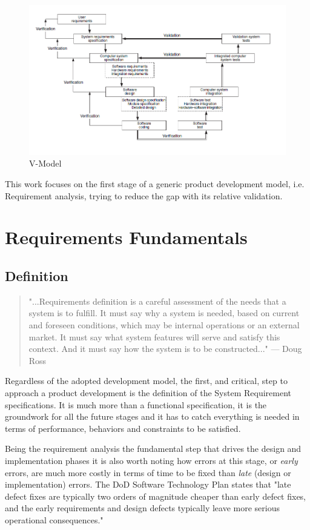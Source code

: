 \begin{figure}[!h]
	\centering 
     \includegraphics[width=\textwidth]{Figs/vmodel.png} 
     \caption{V-Model} 
     \label{fig:vmodel} 
\end{figure} 

This work focuses on the first stage of a generic product development model, i.e. Requirement analysis, trying to reduce the gap with its relative validation.

\section{Requirements Fundamentals}
\subsection{Definition}
\begin{quote}
"...Requirements definition is a careful assessment of the needs that a system is to fulfill. It must say why a
system is needed, based on current and foreseen conditions, which may be internal operations or an external market. It must say what system features will serve and satisfy this context. And it must say how the
system is to be constructed..." — Doug Ross \citep{ross1977structured}
\end{quote}
Regardless of the adopted development model, the first, and critical, step to approach a product development is the definition of the System Requirement specifications. It is much more than a functional specification, it is the groundwork for all the future stages and it has to catch everything is needed in terms of performance, behaviors and constraints to be satisfied. 
\par Being the requirement analysis the fundamental step that drives the design and implementation phases it is also worth noting how errors at this stage, or \textit{early} errors, are much more costly in terms of time to be fixed than \textit{late} (design or implementation) errors. The DoD Software Technology Plan \citep{DoD91} states that "late defect fixes are typically two orders of magnitude cheaper than early defect fixes, and the early requirements and design defects typically leave more serious operational consequences."

